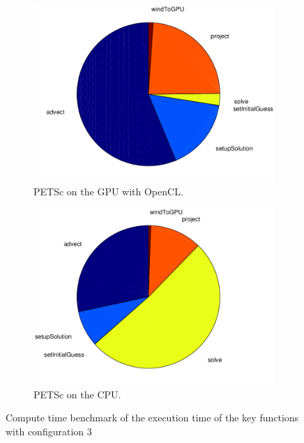 \begin{figure}[ht]
	\center
	
	\begin{subfigure}{0.45\textwidth}
		\center
		\includegraphics[width=1.0\textwidth]{results/data/td/td_conf3_petsc_gpu}
		\caption{PETSc on the GPU with OpenCL.}
		\label{fig:td_conf3_petsc_gpu}
	\end{subfigure}
	\begin{subfigure}{0.45\textwidth}
		\center
		\includegraphics[width=1.0\textwidth]{results/data/td/td_conf3_petsc_cpu}
		\caption{PETSc on the CPU.}
		\label{fig:td_conf3_petsc_cpu}
	\end{subfigure}
	\caption{Compute time benchmark of the execution time of the key functions
			with configuration 3}
	\label{fig:td_conf3}
	
\end{figure}


